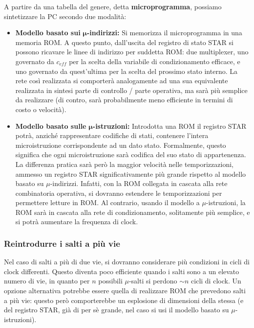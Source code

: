 \documentclass[a4paper,11pt]{article}
\begin{document}
A partire da una tabella del genere, detta \textbf{microprogramma}, possiamo sintetizzare la PC secondo due modalità:
\begin{itemize}
	\item \textbf{Modello basato sui} $\boldsymbol{\mu}$\textbf{-indirizzi:}
		Si memorizza il microprogramma in una memoria ROM. A questo punto, dall'uscita del registro di stato STAR si possono ricavare le linee di indirizzo per suddetta ROM: due multiplexer, uno governato da $c_{eff}$ per la scelta della variabile di condizionamento efficace, e uno governato da quest'ultima per la scelta del prossimo stato interno. La rete così realizzata si comporterà analogamente ad una sua equivalente realizzata in sintesi parte di controllo / parte operativa, ma sarà più semplice da realizzare (di contro, sarà probabilmente meno efficiente in termini di costo o velocità).
		
	\item \textbf{Modello basato sulle} $\boldsymbol{\mu}$\textbf{-istruzioni:}
		Introdotta una ROM il registro STAR potrà, anziché rappresentare codifiche di stati, contenere l'intera microistruzione corrispondente ad un dato stato. Formalmente, questo significa che ogni microistruzione sarà codifica del suo stato di appartenenza. La differenza pratica sarà però la maggior velocità nelle temporizzazioni, ammesso un registro STAR significativamente più grande rispetto al modello basato su $\mu$-indirizzi. Infatti, con la ROM collegata in cascata alla rete combinatoria operativa, si dovranno estendere le temporizzazioni per permettere letture in ROM. Al contrario, usando il modello a $\mu$-istruzioni, la ROM sarà in cascata alla rete di condizionamento, solitamente più semplice, e si potrà aumentare la frequenza di clock. 
\end{itemize}

\subsubsection{Reintrodurre i salti a più vie}
Nel caso di salti a più di due vie, si dovranno considerare più condizioni in cicli di clock differenti.
Questo diventa poco efficiente quando i salti sono a un elevato numero di vie, in quanto per $n$ possibili $\mu$-salti si perdono $\sim n$ cicli di clock.
Un opzione alternativa potrebbe essere quella di realizzare ROM che prevedono salti a più vie: questo però comporterebbe un esplosione di dimensioni della stessa (e del registro STAR, già di per sè grande, nel caso si usi il modello basato su $\mu$-istruzioni).
\end{document}

